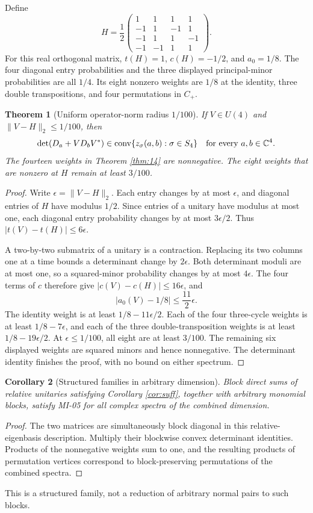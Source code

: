 \documentclass[11pt,a4paper]{article}
\newtheorem{theorem}{Theorem}[section]
\newtheorem{corollary}[theorem]{Corollary}
\newcommand{\C}{\mathbb C}
\newcommand{\conv}{\operatorname{conv}}
\begin{document}
Define
\[
H=\frac12\begin{pmatrix}
1&1&1&1\\-1&1&-1&1\\-1&1&1&-1\\-1&-1&1&1
\end{pmatrix}.
\]
For this real orthogonal matrix, $t(H)=1$, $c(H)=-1/2$, and $a_0=1/8$. The four diagonal entry probabilities and the three displayed principal-minor probabilities are all $1/4$. Its eight nonzero weights are $1/8$ at the identity, three double transpositions, and four permutations in $C_+$.

\begin{theorem}[Uniform operator-norm radius $1/100$]\label{thm:ball}
If $V\in U(4)$ and $\|V-H\|_2\le1/100$, then
\[
\det(D_a+VD_bV^*)\in\conv\{z_\sigma(a,b):\sigma\in S_4\}
\quad\hbox{for every }a,b\in\C^4.
\]
The fourteen weights in Theorem \ref{thm:14} are nonnegative. The eight weights that are nonzero at $H$ remain at least $3/100$.
\end{theorem}
\begin{proof}
Write $\epsilon=\|V-H\|_2$. Each entry changes by at most $\epsilon$, and diagonal entries of $H$ have modulus $1/2$. Since entries of a unitary have modulus at most one, each diagonal entry probability changes by at most $3\epsilon/2$. Thus $|t(V)-t(H)|\le6\epsilon$.

A two-by-two submatrix of a unitary is a contraction. Replacing its two columns one at a time bounds a determinant change by $2\epsilon$. Both determinant moduli are at most one, so a squared-minor probability changes by at most $4\epsilon$. The four terms of $c$ therefore give $|c(V)-c(H)|\le16\epsilon$, and
\[
|a_0(V)-1/8|\le\frac{11}{2}\epsilon.
\]
The identity weight is at least $1/8-11\epsilon/2$. Each of the four three-cycle weights is at least $1/8-7\epsilon$, and each of the three double-transposition weights is at least $1/8-19\epsilon/2$. At $\epsilon\le1/100$, all eight are at least $3/100$. The remaining six displayed weights are squared minors and hence nonnegative. The determinant identity finishes the proof, with no bound on either spectrum.
\end{proof}

\begin{corollary}[Structured families in arbitrary dimension]
Block direct sums of relative unitaries satisfying Corollary \ref{cor:suff}, together with arbitrary monomial blocks, satisfy MI-05 for all complex spectra of the combined dimension.
\end{corollary}
\begin{proof}
The two matrices are simultaneously block diagonal in this relative-eigenbasis description. Multiply their blockwise convex determinant identities. Products of the nonnegative weights sum to one, and the resulting products of permutation vertices correspond to block-preserving permutations of the combined spectra.
\end{proof}
This is a structured family, not a reduction of arbitrary normal pairs to such blocks.
\end{document}
